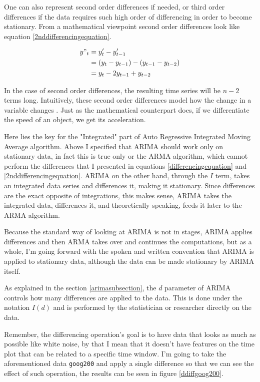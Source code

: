 \documentclass[12pt,a4paper,titlepage]{report}
\begin{document}
One can also represent second order differences if needed, or third order differences if the data requires such high order of differencing in order to become stationary. From a mathematical viewpoint second order differences look like equation \ref{2nddifferencingequation}.

\begin{equation}
\begin{split}
y"_{t} &= y'_{t} - y'_{t-1} \\
       &= (y_{t} - y_{t-1}) - (y_{t-1} - y_{t-2}) \\
       &= y_{t} - 2 y_{t-1} + y_{t-2} \\
\end{split}
\label{2nddifferencingequation}
\end{equation}

In the case of second order differences, the resulting time series will be $ n - 2 $ terms long. Intuitively, these second order differences model how the change in a variable changes \cite{fpp2stationarity}. Just as the mathematical counterpart does, if we differentiate the speed of an object, we get its acceleration.

Here lies the key for the "Integrated" part of Auto Regressive Integrated Moving Average algorithm. Above I specified that ARIMA should work only on stationary data, in fact this is true only or the ARMA algorithm, which cannot perform the differences that I presented in equations \ref{differencingequation} and \ref{2nddifferencingequation}. ARIMA on the other hand, through the $ I $ term, takes an integrated data series and differences it, making it stationary. Since differences are the exact opposite of integrations, this makes sense, ARIMA takes the integrated data, differences it, and theoretically speaking, feeds it later to the ARMA algorithm.

Because the standard way of looking at ARIMA is not in stages, ARIMA applies differences and then ARMA takes over and continues the computations, but as a whole, I'm going forward with the spoken and written convention
that ARIMA is applied to stationary data, although the data can be made stationary by ARIMA itself.

As explained in the section \ref{arimasubsection}, the $ d $ parameter of ARIMA controls how many differences are applied to the data. This is done under the notation $ I(d) $ and is performed by the statistician or researcher directly on the data.

Remember, the differencing operation's goal is to have data that looks as much as possible like white noise, by that I mean that it doesn't have features on the time plot that can be related to a specific time window.
I'm going to take the aforementioned data \texttt{goog200} and apply a single difference so that we can see the effect of such operation, the results can be seen in figure \ref{ddiffgoog200}.
\end{document}
